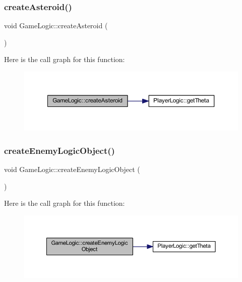 \subsubsection{\texorpdfstring{create\+Asteroid()}{createAsteroid()}}
{\footnotesize\ttfamily void Game\+Logic\+::create\+Asteroid (\begin{DoxyParamCaption}{ }\end{DoxyParamCaption})}

Here is the call graph for this function\+:
\nopagebreak
\begin{figure}[H]
\begin{center}
\leavevmode
\includegraphics[width=350pt]{class_game_logic_ad9b8589c1559ac09ae5674c5c87be600_cgraph}
\end{center}
\end{figure}
\mbox{\label{class_game_logic_ad88d3d16d008722d8a85449beb1ed589}} 
\subsubsection{\texorpdfstring{create\+Enemy\+Logic\+Object()}{createEnemyLogicObject()}}
{\footnotesize\ttfamily void Game\+Logic\+::create\+Enemy\+Logic\+Object (\begin{DoxyParamCaption}{ }\end{DoxyParamCaption})}

Here is the call graph for this function\+:
\nopagebreak
\begin{figure}[H]
\begin{center}
\leavevmode
\includegraphics[width=350pt]{class_game_logic_ad88d3d16d008722d8a85449beb1ed589_cgraph}
\end{center}
\end{figure}
\mbox{\label{class_game_logic_ae19f7458c9a738410d9c54a393346e35}} 
